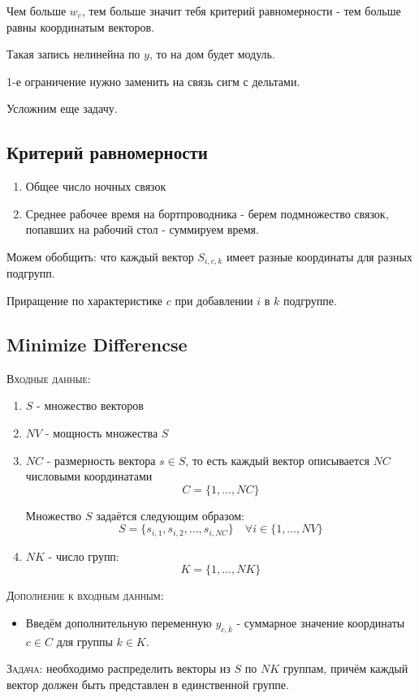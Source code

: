 \documentclass[%
10pt, %
final, %
oneside, %
onecolumn, %
centertags]{article} %
\theoremstyle{plain}
\theoremstyle{definition}
\theoremstyle{remark}
\begin{document}
Чем больше $w_c$, тем больше значит тебя критерий равномерности - тем больше равны координатым векторов.

Такая запись нелинейна по $y$, то на дом будет модуль.

1-е ограничение нужно заменить на связь сигм с дельтами.

Усложним еще задачу.

\subsection{Критерий равномерности}

\begin{enumerate}
	\item Общее число ночных связок
	\item Среднее рабочее время на бортпроводника - берем подмножество связок, попавших на рабочий стол - суммируем время.
\end{enumerate}

Можем обобщить: что каждый вектор $S_{i,c,k}$ имеет разные координаты для разных подгрупп.

Приращение по характеристике $c$ при добавлении $i$ в $k$ подгруппе.
\newpage
\subsection{Minimize Differencse}

\textsc{Входные данные}: 
\begin{enumerate}
	\item $S$ - множество векторов
	\item $NV$ - мощность множества $S$
	\item $NC$ - размерность вектора $s \in S$, то есть каждый вектор описывается $NC$ числовыми координатами
	$$C = \{1,\ldots,NC\}$$

	Множество $S$ задаётся следующим образом:
	$$S = \{s_{i,1},s_{i,2},\ldots,s_{i,NC}\} \quad \forall i \in \{1,\ldots,NV\}$$
	\item $NK$ - число групп:
	$$K = \{1,\ldots,NK\}$$
\end{enumerate}
\textsc{Дополнение к входным данным}:
\begin{itemize}
	\item Введём дополнительную переменную $y_{c,k}$ - суммарное значение координаты $c \in C$ для группы $k \in K$.
\end{itemize}

\textsc{Задача:} необходимо распределить векторы из $S$ по $NK$ группам, причём каждый вектор должен быть представлен в единственной группе.
\end{document}
